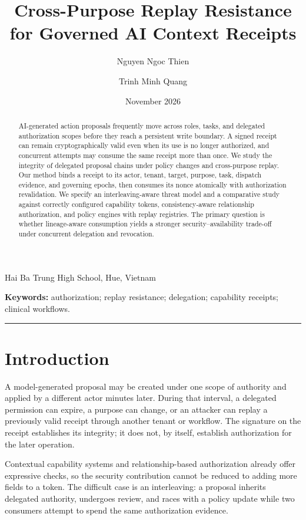 \documentclass[11pt,a4paper]{article}
\title{\vspace{-1em}\textbf{Cross-Purpose Replay Resistance for Governed AI Context Receipts}}
\author{Nguyen Ngoc Thien \and Trinh Minh Quang}\date{November 2026}
\begin{document}
\maketitle
\begin{center}\small Hai Ba Trung High School, Hue, Vietnam\end{center}
\begin{abstract}
AI-generated action proposals frequently move across roles, tasks, and delegated authorization scopes before they reach a persistent write boundary. A signed receipt can remain cryptographically valid even when its use is no longer authorized, and concurrent attempts may consume the same receipt more than once. We study the integrity of delegated proposal chains under policy changes and cross-purpose replay. Our method binds a receipt to its actor, tenant, target, purpose, task, dispatch evidence, and governing epochs, then consumes its nonce atomically with authorization revalidation. We specify an interleaving-aware threat model and a comparative study against correctly configured capability tokens, consistency-aware relationship authorization, and policy engines with replay registries. The primary question is whether lineage-aware consumption yields a stronger security–availability trade-off under concurrent delegation and revocation.
\end{abstract}
\noindent\textbf{Keywords:} authorization; replay resistance; delegation; capability receipts; clinical workflows.
\medskip\hrule\medskip

\section{Introduction}
A model-generated proposal may be created under one scope of authority and applied by a different actor minutes later. During that interval, a delegated permission can expire, a purpose can change, or an attacker can replay a previously valid receipt through another tenant or workflow. The signature on the receipt establishes its integrity; it does not, by itself, establish authorization for the later operation.

Contextual capability systems and relationship-based authorization already offer expressive checks, so the security contribution cannot be reduced to adding more fields to a token. The difficult case is an interleaving: a proposal inherits delegated authority, undergoes review, and races with a policy update while two consumers attempt to spend the same authorization evidence.
\end{document}
